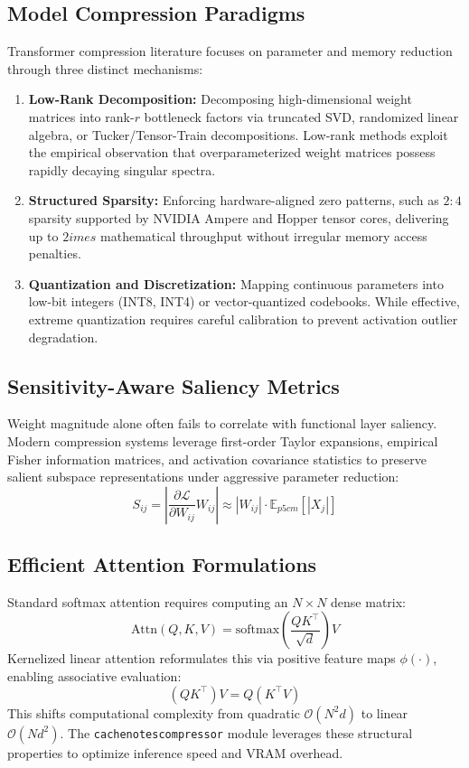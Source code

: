 \subsection{Model Compression Paradigms}
Transformer compression literature focuses on parameter and memory reduction through three distinct mechanisms:
\begin{enumerate}
\item \textbf{Low-Rank Decomposition:} Decomposing high-dimensional weight matrices into rank-$r$ bottleneck factors via truncated SVD, randomized linear algebra, or Tucker/Tensor-Train decompositions. Low-rank methods exploit the empirical observation that overparameterized weight matrices possess rapidly decaying singular spectra.
\item \textbf{Structured Sparsity:} Enforcing hardware-aligned zero patterns, such as $2:4$ sparsity supported by NVIDIA Ampere and Hopper tensor cores, delivering up to $2	imes$ mathematical throughput without irregular memory access penalties.
\item \textbf{Quantization and Discretization:} Mapping continuous parameters into low-bit integers (INT8, INT4) or vector-quantized codebooks. While effective, extreme quantization requires careful calibration to prevent activation outlier degradation.
\end{enumerate}

\subsection{Sensitivity-Aware Saliency Metrics}
Weight magnitude alone often fails to correlate with functional layer saliency. Modern compression systems leverage first-order Taylor expansions, empirical Fisher information matrices, and activation covariance statistics to preserve salient subspace representations under aggressive parameter reduction:
\[
S_{ij} = \left| \frac{\partial \mathcal{L}}{\partial W_{ij}} W_{ij} \right| \approx |W_{ij}| \cdot \mathbb{E}_{p{5cm}}[|X_j|]
\]

\subsection{Efficient Attention Formulations}
Standard softmax attention requires computing an $N \times N$ dense matrix:
\[
\text{Attn}(Q, K, V) = \text{softmax}\left(\frac{Q K^\top}{\sqrt{d}}\right) V
\]
Kernelized linear attention reformulates this via positive feature maps $\phi(\cdot)$, enabling associative evaluation:
\[
(Q K^\top) V = Q (K^\top V)
\]
This shifts computational complexity from quadratic $\mathcal{O}(N^2 d)$ to linear $\mathcal{O}(N d^2)$. The \texttt{cachenotescompressor} module leverages these structural properties to optimize inference speed and VRAM overhead.


